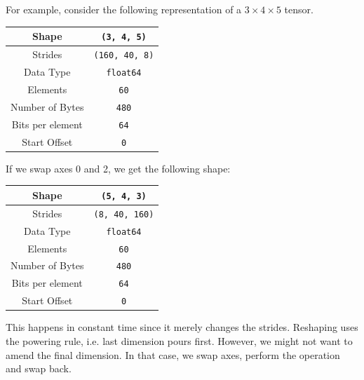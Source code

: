 \documentclass[a4paper, openany]{memoir}
\begin{document}
    For example, consider the following representation of a $3 \times 4 \times 5$ tensor.
    \begin{table}[H]
        \centering
        \begin{tabular}{|c|c|}
            \hline
            Shape & \texttt{(3, 4, 5)} \\
            \hline
            Strides & \texttt{(160, 40, 8)} \\
            \hline
            Data Type & \texttt{float64} \\
            \hline
            Elements & \texttt{60} \\
            \hline
            Number of Bytes & \texttt{480} \\
            \hline
            Bits per element & \texttt{64} \\
            \hline
            Start Offset & \texttt{0} \\
            \hline
        \end{tabular}
    \end{table}
    \noindent If we swap axes 0 and 2, we get the following shape:
    \begin{table}[H]
        \centering
        \begin{tabular}{|c|c|}
            \hline
            Shape & \texttt{(5, 4, 3)} \\
            \hline
            Strides & \texttt{(8, 40, 160)} \\
            \hline
            Data Type & \texttt{float64} \\
            \hline
            Elements & \texttt{60} \\
            \hline
            Number of Bytes & \texttt{480} \\
            \hline
            Bits per element & \texttt{64} \\
            \hline
            Start Offset & \texttt{0} \\
            \hline
        \end{tabular}
    \end{table}
    \noindent This happens in constant time since it merely changes the strides. Reshaping uses the powering rule, i.e. last dimension pours first. However, we might not want to amend the final dimension. In that case, we swap axes, perform the operation and swap back.
\end{document}
